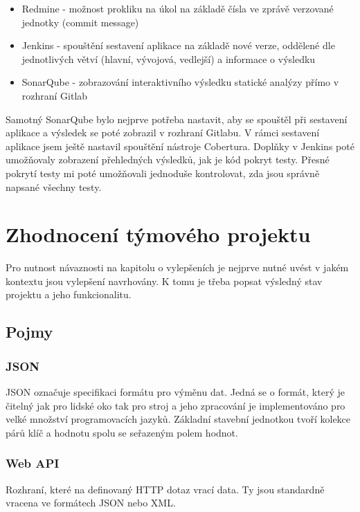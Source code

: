 \documentclass[thesis=B,czech]{FITthesis}[2012/06/26]
\begin{document}
\begin{itemize}
\item Redmine - možnost prokliku na úkol na základě čísla ve zprávě verzované jednotky (commit message)
\item Jenkins - spouštění sestavení aplikace na základě nové verze, oddělené dle jednotlivých větví (hlavní, vývojová, vedlejší) a
				informace o výsledku
\item SonarQube - zobrazování interaktivního výsledku statické analýzy přímo v rozhraní Gitlab
\end{itemize}

Samotný SonarQube bylo nejprve potřeba nastavit, aby se spouštěl při sestavení aplikace a výsledek se poté zobrazil v rozhraní
Gitlabu. V rámci sestavení aplikace jsem ještě nastavil spouštění nástroje Cobertura.
Doplňky v Jenkins poté umožňovaly zobrazení přehledných výsledků, jak je kód pokryt testy. Přesné pokrytí testy mi poté umožňovali 
jednoduše kontrolovat, zda jsou správně napsané všechny testy.

\chapter{Zhodnocení týmového projektu}
Pro nutnost návaznosti na kapitolu o vylepšeních je nejprve nutné uvést v jakém kontextu jsou vylepšení navrhovány. K tomu je třeba
popsat výsledný stav projektu a jeho funkcionalitu. 

\section{Pojmy}

\subsection{JSON}
JSON označuje specifikaci formátu pro výměnu dat\cite{JSON}. Jedná se o formát, který je čitelný jak pro lidské oko tak pro stroj\cite{JSON} a jeho zpracování je implementováno pro velké množství programovacích jazyků\cite{JSON-impl}. Základní stavební jednotkou
tvoří kolekce párů klíč a hodnotu spolu se seřazeným polem hodnot.

\subsection{Web API}
Rozhraní, které na definovaný HTTP dotaz vrací data. Ty jsou standardně vracena ve formátech JSON nebo XML.
\end{document}
